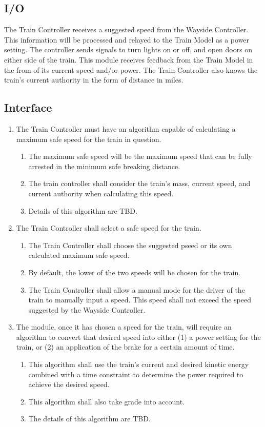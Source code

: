 \documentclass{scrreprt}
\begin{document}
\subsection{I/O}
The Train Controller receives a suggested speed from the Wayside Controller. This information will be processed and relayed to the Train Model as a power setting.  The controller sends signals to turn lights on or off, and open doors on either side of the train.  This module receives feedback from the Train Model in the from of its current speed and/or power.  The Train Controller also knows the train's current authority in the form of distance in miles.

\subsection{Interface}
\begin{enumerate}
\item The Train Controller must have an algorithm capable of calculating a maximum safe speed for the train in question.
	\begin{enumerate}
		\item The maximum safe speed will be the maximum speed that can be fully arrested in the minimum safe breaking distance.
		\item The train controller shall consider the train's mass, current speed, and current authority when calculating this speed.
		\item Details of this algorithm are TBD.
	\end{enumerate}

\item The Train Controller shall select a safe speed for the train.
	\begin{enumerate}
		\item The Train Controller shall choose the suggested pseed or its own calculated maximum safe speed.
		\item By default, the lower of the two speeds will be chosen for the train.
		\item The Train Controller shall allow a manual mode for the driver of the train to manually input a speed.  This speed shall not exceed the speed suggested by the Wayside Controller.
	\end{enumerate}

\item The module, once it has chosen a speed for the train, will require an algorithm to convert that desired speed into either (1) a power setting for the train, or (2) an application of the brake for a certain amount of time.
	\begin{enumerate}
		\item This algorithm shall use the train's current and desired kinetic energy combined with a time constraint to determine the power required to achieve the desired speed.
		\item This algorithm shall also take grade into account.
		\item The details of this algorithm are TBD.
	\end{enumerate}


\end{enumerate}
\end{document}
